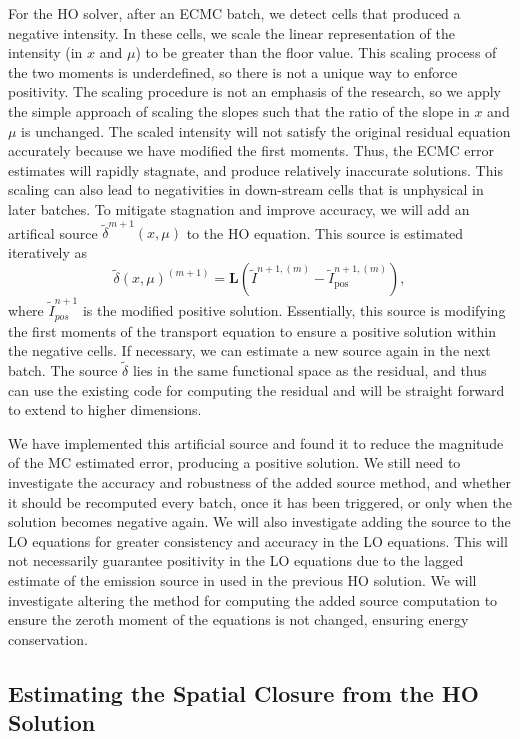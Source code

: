 \documentclass[11pt]{article}
\begin{document}
For the HO solver, after an ECMC batch, we detect cells that produced a negative
intensity. In these cells, we scale the linear representation of the intensity (in
$x$ and $\mu$) to be greater than the floor
value.  This scaling process of the two moments is underdefined, so there is not a unique way to enforce
positivity.  The scaling procedure is not an emphasis of the research, so we apply the simple
approach of scaling the slopes such that the ratio of the slope in $x$ and $\mu$ is
unchanged.  The scaled intensity will not satisfy the original residual equation accurately because we have
modified the first moments.   Thus, the ECMC error estimates will rapidly stagnate,
and produce relatively inaccurate solutions.  This scaling can also lead to
negativities in down-stream cells that is unphysical in later batches.  To mitigate
stagnation and improve accuracy, we will add an artifical source $\tilde\delta^{m+1}(x,\mu)$ to the HO equation.
This source is estimated iteratively as
\begin{equation*}
    \tilde\delta(x,\mu)^{(m+1)} = \mathbf{L}(\tilde{I}^{n+1,(m)} -
    \tilde{I}^{n+1,(m)}_{\text{pos}}),
\end{equation*}
where $\tilde{I}_{pos}^{n+1}$ is the modified positive solution.
Essentially, this source is modifying the first moments of the transport equation to
ensure a positive solution within the negative cells.   If necessary, we can estimate a
new source again in the next batch.  The source
$\tilde\delta$ lies in the same functional space as the residual, and thus can use
the existing code for computing the residual and will be straight forward to extend
to higher dimensions.  

We have implemented this artificial source and found it to reduce the
magnitude of the MC estimated error, producing a positive solution. We still need to
investigate the accuracy and robustness of the
added source method, and whether it should be recomputed every batch, once it has been
triggered, or only when the
solution becomes negative again.   We will also
investigate adding the source to the LO equations for greater consistency and accuracy in
the LO equations.  This will not
necessarily guarantee positivity in the LO equations due to the lagged estimate of the emission source in
used in the previous HO solution.  We will investigate altering the  method for computing the added source computation to ensure the zeroth moment
of the equations is not changed, ensuring energy conservation.

\subsection{Estimating the Spatial Closure from the HO Solution}
\end{document}
